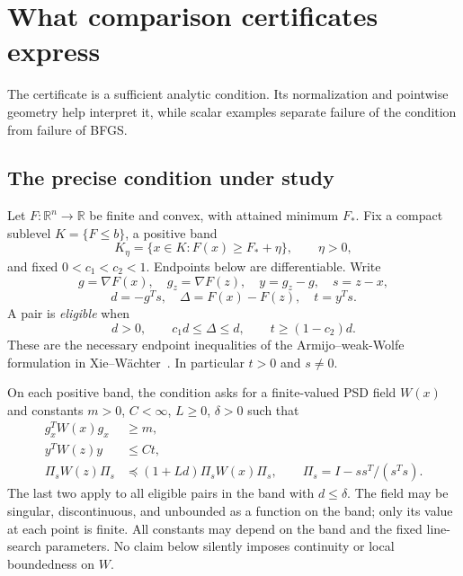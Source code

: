 \chapter{What comparison certificates express}\label{comp:G}\label{G:chapter}
\renewcommand{\ModuleTag}{5}
The certificate is a sufficient analytic condition. Its normalization and pointwise geometry help interpret it, while scalar examples separate failure of the condition from failure of BFGS.


\begingroup
\providecommand{\R}{}
\renewcommand{\R}{\mathbb R}
\providecommand{\PSD}{}
\renewcommand{\PSD}{\succeq0}
\providecommand{\range}{}
\renewcommand{\range}{\operatorname{range}}
\providecommand{\aff}{}
\renewcommand{\aff}{\operatorname{aff}}
\providecommand{\conv}{}
\renewcommand{\conv}{\operatorname{conv}}
\providecommand{\norm}{}
\renewcommand{\norm}[1]{\left\|#1\right\|}
\providecommand{\ip}{}
\renewcommand{\ip}[2]{\langle #1,#2\rangle}
\makeatletter\let\c@lemma\c@theorem\let\c@corollary\c@theorem\let\c@proposition\c@theorem\let\c@remark\c@theorem\makeatother
\renewcommand{\thelemma}{\thetheorem}\renewcommand{\thecorollary}{\thetheorem}\renewcommand{\theproposition}{\thetheorem}\renewcommand{\theremark}{\thetheorem}
\renewcommand{\thetheorem}{5.\arabic{section}.\arabic{theorem}}
\setcounter{section}{0}
\setcounter{theorem}{0}
\setcounter{equation}{0}


\section{The precise condition under study}
Let $F:\R^n\to\R$ be finite and convex, with attained minimum $F_*$. Fix a compact sublevel $K=\{F\le b\}$, a positive band
\[
 K_\eta=\{x\in K:F(x)\ge F_*+\eta\},\qquad \eta>0,
\]
and fixed $0<c_1<c_2<1$. Endpoints below are differentiable. Write
\[
 g=\nabla F(x),\quad g_z=\nabla F(z),\quad y=g_z-g,\quad s=z-x,
\]
\[
 d=-g^Ts,\quad \Delta=F(x)-F(z),\quad t=y^Ts.
\]
A pair is \emph{eligible} when
\begin{equation}
 d>0,\qquad c_1d\le\Delta\le d,\qquad t\ge(1-c_2)d. \tag{5.E}
\end{equation}
These are the necessary endpoint inequalities of the Armijo--weak-Wolfe formulation in Xie--W\"achter~\cite{XW}. In particular $t>0$ and $s\ne0$.

On each positive band, the condition asks for a finite-valued PSD field $W(x)$ and constants $m>0$, $C<\infty$, $L\ge0$, $\delta>0$ such that
\begin{align}
 g_x^TW(x)g_x&\ge m, \tag{5.V}\\
 y^TW(z)y&\le Ct, \tag{5.S}\\
 \Pi_sW(z)\Pi_s&\preceq(1+Ld)\Pi_sW(x)\Pi_s,
 \qquad \Pi_s=I-ss^T/(s^Ts). \tag{5.T}
\end{align}
The last two apply to all eligible pairs in the band with $d\le\delta$. The field may be singular, discontinuous, and unbounded as a function on the band; only its value at each point is finite. All constants may depend on the band and the fixed line-search parameters. No claim below silently imposes continuity or local boundedness on $W$.

